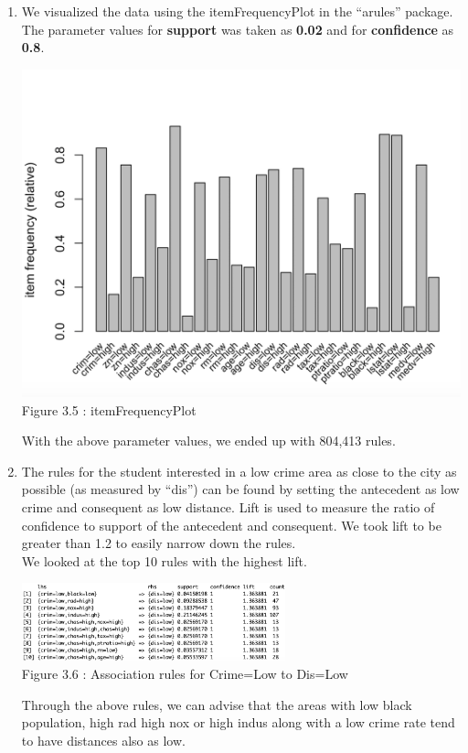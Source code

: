\documentclass[11pt]{article}
\begin{document}
\begin{enumerate}
\begin{enumerate}
    \item We visualized the data using the itemFrequencyPlot in the “arules” package. The parameter values for \textbf{support} was taken as \textbf{0.02} and for \textbf{confidence} as \textbf{0.8}.
    \begin{center}
    \includegraphics[height=0.5\textwidth]{s1_5.png}
    \\\footnotesize Figure 3.5 : itemFrequencyPlot 
   \end{center}
    With the above parameter values, we ended up with 804,413 rules.
    
    \item The  rules for the student interested in a low crime area as close to the city as possible (as measured by “dis”) can be  found by setting the antecedent as low crime and consequent as low distance. Lift is used to measure the ratio of confidence to support of the antecedent and consequent. We took lift to be greater than 1.2 to easily narrow down the rules.
    \\ We looked at the top 10 rules with the highest lift.
    \begin{center}
    \includegraphics[width=0.6\textwidth]{sssshhhh.png}
    \\\footnotesize Figure 3.6 : Association rules for Crime=Low to Dis=Low 
\end{center}
    Through the above rules, we can advise that the areas with low black population, high rad high nox or high indus along with a low crime rate tend to have distances also as low.
    

\end{enumerate}
\end{enumerate}
\end{document}
